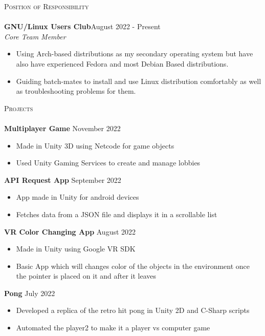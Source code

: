 \documentclass[a4paper]{article}
\newcommand{\lineunder} {
    \vspace*{-8pt} \\
    \hspace*{-18pt} \hrulefill \\
}
\newcommand{\header} [1] {
    {\hspace*{-18pt}\vspace*{6pt} \textsc{#1}}
    \vspace*{-6pt} \lineunder
}
\begin{document}
\vspace{1mm}

\header{Position of Responsibility}
\vspace{0mm}
\textbf{GNU/Linux Users Club}\hfill August 2022 - Present\\
{\textit {Core Team Member}}  
\vspace{-1mm}
\begin{itemize} 
	\item Using Arch-based distributions as my secondary operating system but have also have experienced Fedora and most Debian Based distributions.
        \item Guiding batch-mates to install and use Linux distribution comfortably as well as troubleshooting problems for them. 
\end{itemize}

\vspace{1mm}

\header{Projects}

{\textbf{Multiplayer Game}} \hfill November 2022
\vspace{-1mm}
\begin{itemize} 
	\item Made in Unity 3D using Netcode for game objects
        \item Used Unity Gaming Services to create and manage lobbies 
\end{itemize}

{\textbf{API Request App}} \hfill September 2022
\vspace{-1mm}
\begin{itemize} 
	\item App made in Unity for android devices
        \item Fetches data from a JSON file and displays it in a scrollable list
\end{itemize}

{\textbf{VR Color Changing App}} \hfill August 2022
\vspace{-1mm}
\begin{itemize} 
	\item Made in Unity using Google VR SDK
        \item Basic App which will changes color of the objects in the environment once the pointer is placed on it and after it leaves
\end{itemize}

{\textbf{Pong}} \hfill July 2022
\vspace{-1mm}
\begin{itemize} 
	\item Developed a replica of the retro hit pong in Unity 2D and C-Sharp scripts
        \item Automated the player2 to make it a player vs computer game
\end{itemize}
\end{document}
